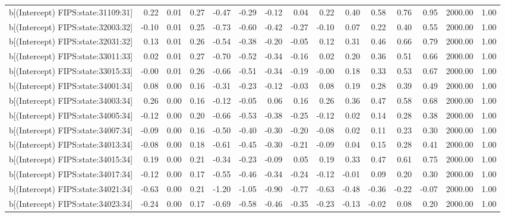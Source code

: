\begin{table}[ht]
\begin{tabular}{rrrrrrrrrrrrrrr}
  b[(Intercept) FIPS:state:31109:31] & 0.22 & 0.01 & 0.27 & -0.47 & -0.29 & -0.12 & 0.04 & 0.22 & 0.40 & 0.58 & 0.76 & 0.95 & 2000.00 & 1.00 \\ 
  b[(Intercept) FIPS:state:32003:32] & -0.10 & 0.01 & 0.25 & -0.73 & -0.60 & -0.42 & -0.27 & -0.10 & 0.07 & 0.22 & 0.40 & 0.55 & 2000.00 & 1.00 \\ 
  b[(Intercept) FIPS:state:32031:32] & 0.13 & 0.01 & 0.26 & -0.54 & -0.38 & -0.20 & -0.05 & 0.12 & 0.31 & 0.46 & 0.66 & 0.79 & 2000.00 & 1.00 \\ 
  b[(Intercept) FIPS:state:33011:33] & 0.02 & 0.01 & 0.27 & -0.70 & -0.52 & -0.34 & -0.16 & 0.02 & 0.20 & 0.36 & 0.51 & 0.66 & 2000.00 & 1.00 \\ 
  b[(Intercept) FIPS:state:33015:33] & -0.00 & 0.01 & 0.26 & -0.66 & -0.51 & -0.34 & -0.19 & -0.00 & 0.18 & 0.33 & 0.53 & 0.67 & 2000.00 & 1.00 \\ 
  b[(Intercept) FIPS:state:34001:34] & 0.08 & 0.00 & 0.16 & -0.31 & -0.23 & -0.12 & -0.03 & 0.08 & 0.19 & 0.28 & 0.39 & 0.49 & 2000.00 & 1.00 \\ 
  b[(Intercept) FIPS:state:34003:34] & 0.26 & 0.00 & 0.16 & -0.12 & -0.05 & 0.06 & 0.16 & 0.26 & 0.36 & 0.47 & 0.58 & 0.68 & 2000.00 & 1.00 \\ 
  b[(Intercept) FIPS:state:34005:34] & -0.12 & 0.00 & 0.20 & -0.66 & -0.53 & -0.38 & -0.25 & -0.12 & 0.02 & 0.14 & 0.28 & 0.38 & 2000.00 & 1.00 \\ 
  b[(Intercept) FIPS:state:34007:34] & -0.09 & 0.00 & 0.16 & -0.50 & -0.40 & -0.30 & -0.20 & -0.08 & 0.02 & 0.11 & 0.23 & 0.30 & 2000.00 & 1.00 \\ 
  b[(Intercept) FIPS:state:34013:34] & -0.08 & 0.00 & 0.18 & -0.61 & -0.45 & -0.30 & -0.21 & -0.09 & 0.04 & 0.15 & 0.28 & 0.41 & 2000.00 & 1.00 \\ 
  b[(Intercept) FIPS:state:34015:34] & 0.19 & 0.00 & 0.21 & -0.34 & -0.23 & -0.09 & 0.05 & 0.19 & 0.33 & 0.47 & 0.61 & 0.75 & 2000.00 & 1.00 \\ 
  b[(Intercept) FIPS:state:34017:34] & -0.12 & 0.00 & 0.17 & -0.55 & -0.46 & -0.34 & -0.24 & -0.12 & -0.01 & 0.09 & 0.20 & 0.30 & 2000.00 & 1.00 \\ 
  b[(Intercept) FIPS:state:34021:34] & -0.63 & 0.00 & 0.21 & -1.20 & -1.05 & -0.90 & -0.77 & -0.63 & -0.48 & -0.36 & -0.22 & -0.07 & 2000.00 & 1.00 \\ 
  b[(Intercept) FIPS:state:34023:34] & -0.24 & 0.00 & 0.17 & -0.69 & -0.58 & -0.46 & -0.35 & -0.23 & -0.13 & -0.02 & 0.08 & 0.20 & 2000.00 & 1.00 \\ 

\end{tabular}
\end{table}

